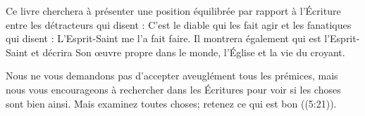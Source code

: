 Ce livre cherchera à présenter une position équilibrée par rapport à l'Écriture entre les détracteurs qui disent : \og C'est le diable qui les fait agir \fg{} et les fanatiques qui disent : \og L'Esprit-Saint me l'a fait faire. \fg{} Il montrera également qui est l'Esprit-Saint et décrira Son œuvre propre dans le monde, l'Église et la vie du croyant.

Nous ne vous demandons pas d'accepter aveuglément tous les prémices, mais nous vous encourageons à rechercher dans les Écritures pour voir si les choses sont bien ainsi. \og Mais examinez toutes choses; retenez ce qui est bon \fg{} ((5:21)).

